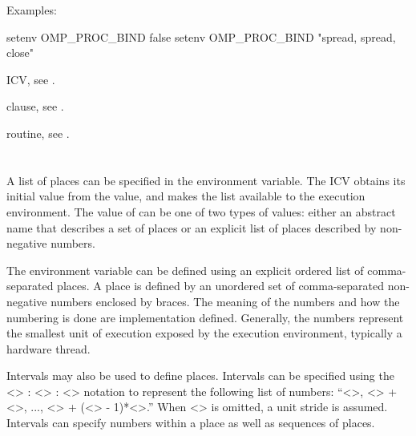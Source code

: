 Examples:
\begin{ompEnv}
setenv OMP_PROC_BIND false
setenv OMP_PROC_BIND "spread, spread, close"
\end{ompEnv}

\begin{crossrefs}
\item {} ICV, see .

\item {} clause, 
see .

\item {} routine, see .
\end{crossrefs}



\section{}
\label{sec:OMP_PLACES}
A list of places can be specified in the  environment 
variable. The  ICV obtains its initial value 
from the  value, and makes the list available to the 
execution environment. The value of  can be one of
two types of values: either an abstract name that describes a set of places 
or an explicit list of places described by non-negative numbers.

The  environment variable can be defined using an 
explicit ordered list of comma-separated places. A place is defined by 
an unordered set of comma-separated non-negative numbers enclosed by 
braces. The meaning of the numbers and how the numbering is done are 
implementation defined. Generally, the numbers represent the smallest 
unit of execution exposed by the execution environment, typically a hardware
thread.

Intervals may also be used to define places. Intervals can be specified 
using the <> : <> : <> notation 
to represent the following list of numbers: ``<>, 
<> + <>, ..., <> + 
(<> - 1)*<>.'' When <> is omitted, a 
unit stride is assumed. Intervals can specify numbers within a place as 
well as sequences of places.

